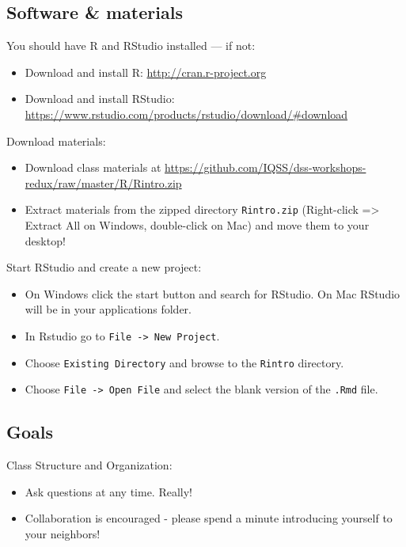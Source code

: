 \documentclass[]{book}
\providecommand{\tightlist}{%
  \setlength{\itemsep}{0pt}\setlength{\parskip}{0pt}}
\begin{document}
\subsection{Software \& materials}\label{software-materials}

You should have R and RStudio installed --- if not:

\begin{itemize}
\tightlist
\item
  Download and install R: \url{http://cran.r-project.org}
\item
  Download and install RStudio:
  \url{https://www.rstudio.com/products/rstudio/download/\#download}
\end{itemize}

Download materials:

\begin{itemize}
\tightlist
\item
  Download class materials at
  \url{https://github.com/IQSS/dss-workshops-redux/raw/master/R/Rintro.zip}
\item
  Extract materials from the zipped directory \texttt{Rintro.zip}
  (Right-click =\textgreater{} Extract All on Windows, double-click on
  Mac) and move them to your desktop!
\end{itemize}

Start RStudio and create a new project:

\begin{itemize}
\tightlist
\item
  On Windows click the start button and search for RStudio. On Mac
  RStudio will be in your applications folder.
\item
  In Rstudio go to \texttt{File\ -\textgreater{}\ New\ Project}.
\item
  Choose \texttt{Existing\ Directory} and browse to the \texttt{Rintro}
  directory.
\item
  Choose \texttt{File\ -\textgreater{}\ Open\ File} and select the blank
  version of the \texttt{.Rmd} file.
\end{itemize}

\subsection{Goals}\label{goals}

Class Structure and Organization:

\begin{itemize}
\tightlist
\item
  Ask questions at any time. Really!
\item
  Collaboration is encouraged - please spend a minute introducing
  yourself to your neighbors!
\end{itemize}
\end{document}
